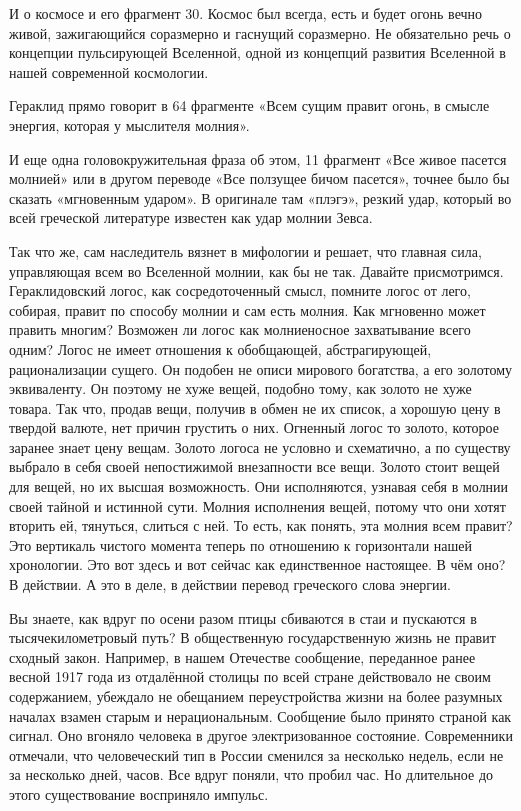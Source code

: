 И о космосе и его фрагмент 30. Космос был всегда, есть и будет огонь вечно
живой, зажигающийся соразмерно и гаснущий соразмерно. Не обязательно речь о
концепции пульсирующей Вселенной, одной из концепций развития Вселенной в нашей
современной космологии. 

Гераклид прямо говорит в 64 фрагменте «Всем сущим правит
огонь, в смысле энергия, которая у мыслителя молния». 

И еще одна
головокружительная фраза об этом, 11 фрагмент «Все живое пасется молнией» или в
другом переводе «Все ползущее бичом пасется», точнее было бы сказать «мгновенным
ударом». В оригинале там «плэгэ», резкий удар, который во всей греческой
литературе известен как удар молнии Зевса. 

Так что же, сам наследитель вязнет в
мифологии и решает, что главная сила, управляющая всем во Вселенной молнии, как
бы не так. Давайте присмотримся. Гераклидовский логос, как сосредоточенный
смысл, помните логос от лего, собирая, правит по способу молнии и сам есть
молния. Как мгновенно может править многим? Возможен ли логос как молниеносное
захватывание всего одним? Логос не имеет отношения к обобщающей, абстрагирующей,
рационализации сущего. Он подобен не описи мирового богатства, а его золотому
эквиваленту. Он поэтому не хуже вещей, подобно тому, как золото не хуже товара.
Так что, продав вещи, получив в обмен не их список, а хорошую цену в твердой
валюте, нет причин грустить о них. Огненный логос то золото, которое заранее
знает цену вещам. Золото логоса не условно и схематично, а по существу выбрало в
себя своей непостижимой внезапности все вещи. Золото стоит вещей для вещей, но
их высшая возможность. Они исполняются, узнавая себя в молнии своей тайной и
истинной сути. Молния исполнения вещей, потому что они хотят вторить ей,
тянуться, слиться с ней. То есть, как понять, эта молния всем правит? Это
вертикаль чистого момента теперь по отношению к горизонтали нашей хронологии.
Это вот здесь и вот сейчас как единственное настоящее. В чём оно? В действии. А
это в деле, в действии перевод греческого слова энергии. 

Вы знаете, как вдруг по осени разом птицы сбиваются в стаи и пускаются в тысячекилометровый путь? В общественную государственную жизнь не правит сходный закон. Например, в нашем Отечестве сообщение, переданное ранее весной 1917 года из отдалённой столицы по всей стране действовало не своим содержанием, убеждало не обещанием переустройства жизни на более разумных началах взамен старым и нерациональным.
Сообщение было принято страной как сигнал. Оно вгоняло человека в другое электризованное состояние. Современники отмечали, что человеческий тип в России сменился за несколько недель, если не за несколько дней, часов. Все вдруг поняли, что пробил час. Но длительное до этого существование восприняло импульс.

